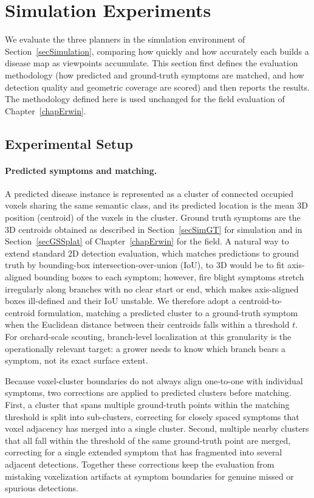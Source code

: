 \section{Simulation Experiments} \label{secSimExperiments}

We evaluate the three planners in the simulation environment of
Section~\ref{secSimulation}, comparing how quickly and how accurately each
builds a disease map as viewpoints accumulate.
This section first defines the evaluation methodology (how predicted and
ground-truth symptoms are matched, and how detection quality and geometric
coverage are scored) and then reports the results.
The methodology defined here is used unchanged for the field evaluation of
Chapter~\ref{chapErwin}.

\subsection{Experimental Setup} \label{secSimSetup}

\paragraph{Predicted symptoms and matching.}
A predicted disease instance is represented as a cluster of connected
occupied voxels sharing the same semantic class, and its predicted location
is the mean 3D position (centroid) of the voxels in the cluster.
Ground truth symptoms are the 3D centroids obtained as described in
Section~\ref{secSimGT} for simulation and in Section~\ref{secGSSplat} of
Chapter~\ref{chapErwin} for the field.
A natural way to extend standard 2D detection evaluation, which matches
predictions to ground truth by bounding-box intersection-over-union
(IoU), to 3D would be to fit axis-aligned bounding boxes to each symptom;
however, fire blight symptoms stretch irregularly along branches with no
clear start or end, which makes axis-aligned boxes ill-defined and their
IoU unstable.
We therefore adopt a centroid-to-centroid formulation, matching a predicted
cluster to a ground-truth symptom when the Euclidean distance between their
centroids falls within a threshold $t$.
For orchard-scale scouting, branch-level localization at this granularity
is the operationally relevant target: a grower needs to know which branch
bears a symptom, not its exact surface extent.

Because voxel-cluster boundaries do not always align one-to-one with
individual symptoms, two corrections are applied to predicted clusters
before matching.
First, a cluster that spans multiple ground-truth points within the
matching threshold is split into sub-clusters, correcting for closely
spaced symptoms that voxel adjacency has merged into a single cluster.
Second, multiple nearby clusters that all fall within the threshold of the
same ground-truth point are merged, correcting for a single extended
symptom that has fragmented into several adjacent detections.
Together these corrections keep the evaluation from mistaking voxelization
artifacts at symptom boundaries for genuine missed or spurious detections.

